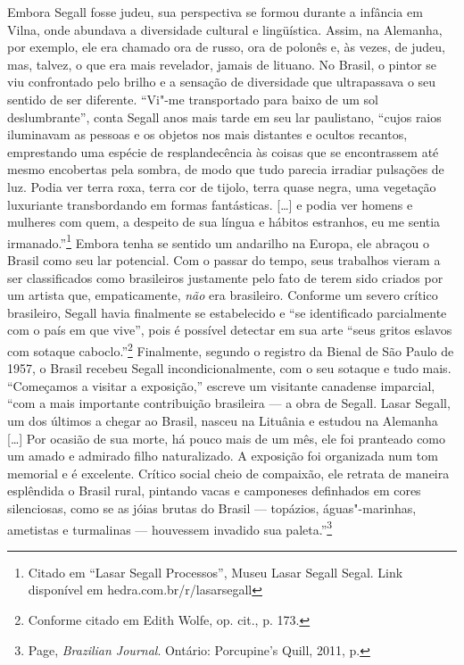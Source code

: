 {Embora Segall fosse judeu, sua perspectiva se formou durante a infância
em Vilna, onde abundava a diversidade cultural e lingüística. Assim, na
Alemanha, por exemplo, ele era chamado ora de russo, ora de polonês e,
às vezes, de judeu, mas, talvez, o que era mais revelador, jamais de
lituano. No Brasil, o pintor se viu confrontado pelo brilho e a sensação
de diversidade que ultrapassava o seu sentido de ser diferente. ``Vi"-me
transportado para baixo de um sol deslumbrante'', conta Segall anos mais
tarde em seu lar paulistano, ``cujos raios iluminavam as pessoas e os
objetos nos mais distantes e ocultos recantos, emprestando uma espécie
de resplandecência às coisas que se encontrassem até mesmo encobertas
pela sombra, de modo que tudo parecia irradiar pulsações de luz. Podia
ver terra roxa, terra cor de tijolo, terra quase negra, uma vegetação
luxuriante transbordando em formas fantásticas. {[}\ldots{}{]} e podia
ver homens e mulheres com quem, a despeito de sua língua e hábitos
estranhos, eu me sentia irmanado.''\footnote{Citado em ``Lasar Segall
  Processos'', Museu Lasar Segall Segal. Link disponível em hedra.com.br/r/lasarsegall} Embora tenha se sentido um andarilho na
Europa, ele abraçou o Brasil como seu lar potencial. Com o passar do
tempo, seus trabalhos vieram a ser classificados como brasileiros
justamente pelo fato de terem sido criados por um artista que,
empaticamente, \textit{não} era brasileiro. Conforme um severo crítico
brasileiro, Segall havia finalmente se estabelecido e ``se identificado
parcialmente com o país em que vive'', pois é possível detectar em sua
arte ``seus gritos eslavos com sotaque caboclo.''\footnote{Conforme
  citado em Edith Wolfe, op. cit., p. 173.} Finalmente, segundo o registro da Bienal
de São Paulo de 1957, o Brasil recebeu Segall incondicionalmente, com o
seu sotaque e tudo mais. ``Começamos a visitar a exposição,'' escreve um
visitante canadense imparcial, ``com a mais importante contribuição
brasileira --- a obra de Segall. Lasar Segall, um dos últimos a chegar ao
Brasil, nasceu na Lituânia e estudou na Alemanha {[}\ldots{}{]} Por
ocasião de sua morte, há pouco mais de um mês, ele foi pranteado como um
amado e admirado filho naturalizado. A exposição foi organizada num tom
memorial e é excelente. Crítico social cheio de compaixão, ele retrata
de maneira esplêndida o Brasil rural, pintando vacas e camponeses
definhados em cores silenciosas, como se as jóias brutas do Brasil ---
topázios, águas"-marinhas, ametistas e turmalinas --- houvessem invadido
sua paleta.''\footnote{ Page, \textit{Brazilian Journal}. Ontário: Porcupine's Quill, 2011, p.
}}
